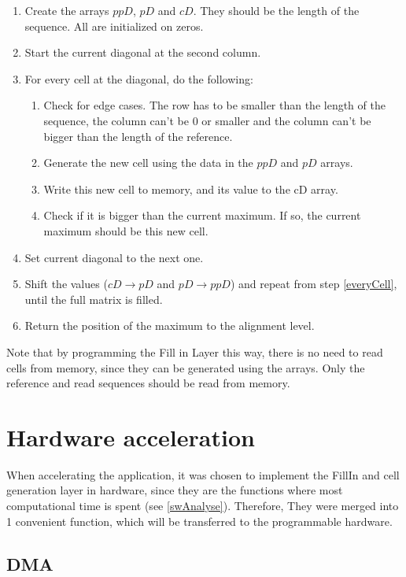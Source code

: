 \begin{enumerate}
	\item Create the arrays $ppD$, $pD$ and $cD$. They should be the length of the sequence. All are initialized on zeros.
	\item Start the current diagonal at the second column.
	\item \label{everyCell}For every cell at the diagonal, do the following:
	\begin{enumerate}
		\item Check for edge cases. The row has to be smaller than the length of the sequence, the column can't be 0 or smaller and the column can't be bigger than the length of the reference.
		\item Generate the new cell using the data in the $ppD$ and $pD$ arrays.
		\item Write this new cell to memory, and its value to the cD array.
		\item Check if it is bigger than the current maximum. If so, the current maximum should be this new cell. 
	\end{enumerate}
	\item Set current diagonal to the next one.
	\item Shift the values ($cD \rightarrow pD$ and $pD \rightarrow ppD$) and repeat from step \ref{everyCell}, until the full matrix is filled.
	\item Return the position of the maximum to the alignment level.
\end{enumerate}

Note that by programming the Fill in Layer this way, there is no need to read cells from memory, since they can be generated using the arrays. Only the reference and read sequences should be read from memory. 

\section{Hardware acceleration}

When accelerating the application, it was chosen to implement the FillIn and cell generation layer in hardware, since they are the functions where most computational time is spent (see \ref{swAnalyse}). Therefore, They were merged into 1 convenient function, which will be transferred to the programmable hardware. 

\subsection{DMA}

